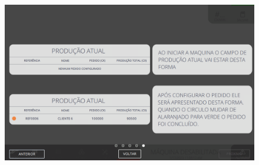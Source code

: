\begin{figure}[h]
  \centering
  \includegraphics[width=576px,height=360px]{src/imagesFlexo/01-main/e-5.png}
\end{figure}

\vspace*{\fill}